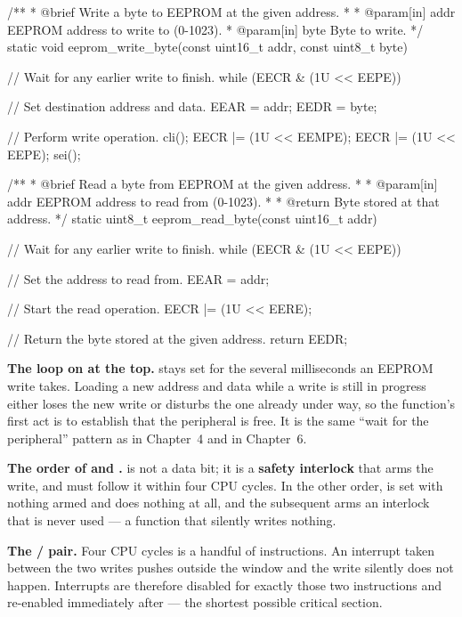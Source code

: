 
\begin{ccode}
/**
 * @brief Write a byte to EEPROM at the given address.
 *
 * @param[in] addr EEPROM address to write to (0-1023).
 * @param[in] byte Byte to write.
 */
static void eeprom_write_byte(const uint16_t addr, const uint8_t byte)
{
    // Wait for any earlier write to finish.
    while (EECR & (1U << EEPE)) {}

    // Set destination address and data.
    EEAR = addr;
    EEDR = byte;

    // Perform write operation.
    cli();
    EECR |= (1U << EEMPE);
    EECR |= (1U << EEPE);
    sei();
}

/**
 * @brief Read a byte from EEPROM at the given address.
 *
 * @param[in] addr EEPROM address to read from (0-1023).
 *
 * @return Byte stored at that address.
 */
static uint8_t eeprom_read_byte(const uint16_t addr)
{
    // Wait for any earlier write to finish.
    while (EECR & (1U << EEPE)) {}

    // Set the address to read from.
    EEAR = addr;

    // Start the read operation.
    EECR |= (1U << EERE);

    // Return the byte stored at the given address.
    return EEDR;
}
\end{ccode}

\textbf{The loop on  at the top.}  stays set for the several milliseconds an
EEPROM write takes. Loading a new address and data while a write is still in progress either loses
the new write or disturbs the one already under way, so the function's first act is to establish
that the peripheral is free. It is the same ``wait for the peripheral'' pattern as  in
Chapter~4 and  in Chapter~6. 

\textbf{The order of  and .}  is not a data bit; it is a
\textbf{safety interlock} that arms the write, and  must follow it within four CPU
cycles. In the other order,  is set with nothing armed and does nothing at all, and the
subsequent  arms an interlock that is never used --- a function that silently writes
nothing. 

\textbf{The / pair.} Four CPU cycles is a handful of instructions. An
interrupt taken between the two writes pushes  outside the window and the write silently
does not happen. Interrupts are therefore disabled for exactly those two instructions and re-enabled
immediately after --- the shortest possible critical section. 

